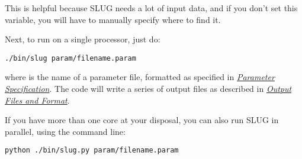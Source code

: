 \documentclass[letterpaper,10pt,english]{sphinxmanual}
\begin{document}
This is helpful because SLUG needs a lot of input data, and if you don't set this variable, you will have to manually specify where to find it.

Next, to run on a single processor, just do:

\begin{Verbatim}[commandchars=\\\{\}]
./bin/slug param/filename.param
\end{Verbatim}

where  is the name of a parameter file, formatted as specified in {\hyperref[parameters:sec\string-parameters]{\emph{Parameter Specification}}}. The code will write a series of output files as described in {\hyperref[output:sec\string-output]{\emph{Output Files and Format}}}.

If you have more than one core at your disposal, you can also run SLUG in parallel, using the command line:

\begin{Verbatim}[commandchars=\\\{\}]
python ./bin/slug.py param/filename.param
\end{Verbatim}
\end{document}
